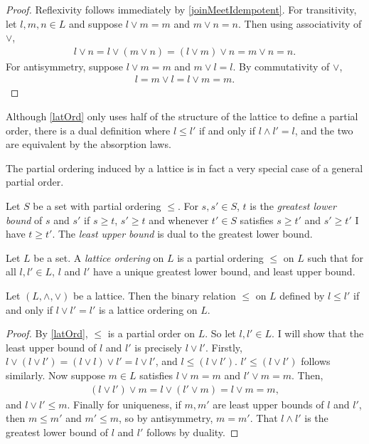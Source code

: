 \begin{proof}
  Reflexivity follows immediately by \cref{joinMeetIdempotent}. For transitivity, let $l, m, n \in L$ and suppose
  $l \vee m = m$ and $m \vee n = n$. Then using associativity of $\vee$,
  \begin{align*}
    l \vee n = l \vee (m \vee n) = (l \vee m) \vee n = m \vee n = n.
  \end{align*}
  For antisymmetry, suppose $l \vee m = m$ and $m \vee l = l$. By commutativity of $\vee$, 
  \begin{align*}
    l = m \vee l = l \vee m = m.
  \end{align*}
\end{proof}
\begin{remark}
  Although \cref{latOrd} only uses half of the structure of the lattice to define a partial order,
  there is a dual definition where $l \leq l'$ if and only if $l \wedge l' = l$, and the two are equivalent by the absorption laws.
\end{remark}
The partial ordering induced by a lattice is in fact a very special case of a general partial order.
\begin{definition}
  Let $S$ be a set with partial ordering $\leq$. For $s, s' \in S$, $t$ is the \emph{greatest lower bound} of $s$ and $s'$
  if $s \geq t$, $s' \geq t$ and whenever $t' \in S$ satisfies $s \geq t'$ and $s' \geq t'$ I have $t \geq t'$.
  The \emph{least upper bound} is dual to the greatest lower bound.
\end{definition}
\begin{definition}
  Let $L$ be a set. A \emph{lattice ordering} on $L$ is a partial ordering $\leq$ on $L$ such that for all $l, l' \in L$, $l$ and $l'$
  have a unique greatest lower bound, and least upper bound.
\end{definition}
\begin{prop}
  Let $(L, \wedge, \vee)$ be a lattice. Then the binary relation $\leq$ on $L$ defined by $l \leq l'$ if and only if
  $l \vee l' = l'$ is a lattice ordering on $L$.
\end{prop}
\begin{proof}
  By \cref{latOrd}, $\leq$ is a partial order on $L$. So let $l, l' \in L$. I will show that the least upper bound of
  $l$ and $l'$ is precisely $l \vee l'$. Firstly, $l \vee (l \vee l') = (l \vee l) \vee l' = l \vee l'$, and $l \leq (l \vee l')$.
  $l' \leq (l \vee l')$ follows similarly. Now suppose $m \in L$ satisfies $l \vee m = m$ and $l' \vee m = m$. Then,
  \begin{align*}
    (l \vee l') \vee m = l \vee (l' \vee m) = l \vee m = m,
  \end{align*}
  and $l \vee l' \leq m$. Finally for uniqueness, if $m, m'$ are least upper bounds of $l$ and $l'$, then $m \leq m'$ and $m' \leq m$,
  so by antisymmetry, $m = m'$. That $l \wedge l'$ is the greatest lower bound of $l$ and $l'$ follows by duality.
\end{proof}
